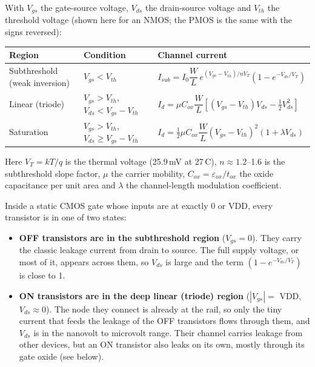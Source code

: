 \documentclass[10pt]{article}
\begin{document}
With $V_{gs}$ the gate-source voltage, $V_{ds}$ the drain-source voltage and $V_{th}$ the
threshold voltage (shown here for an NMOS; the PMOS is the same with the signs reversed):

\begin{table}[H]
\centering
\small
\begin{tabularx}{\textwidth}{@{}p{3.2cm}p{3.6cm}L@{}}
\toprule
Region & Condition & Channel current \\
\midrule
Subthreshold (weak inversion) & $V_{gs} < V_{th}$ & $I_{sub} = I_0 \dfrac{W}{L}\, e^{(V_{gs}-V_{th})/nV_T}\left(1 - e^{-V_{ds}/V_T}\right)$ \\[8pt]
Linear (triode) & $V_{gs} > V_{th}$, $V_{ds} < V_{gs} - V_{th}$ & $I_{d} = \mu C_{ox} \dfrac{W}{L}\left[(V_{gs}-V_{th})V_{ds} - \tfrac{1}{2}V_{ds}^2\right]$ \\[8pt]
Saturation & $V_{gs} > V_{th}$, $V_{ds} \ge V_{gs} - V_{th}$ & $I_{d} = \tfrac{1}{2}\mu C_{ox} \dfrac{W}{L}(V_{gs}-V_{th})^2(1+\lambda V_{ds})$ \\
\bottomrule
\end{tabularx}
\end{table}

Here $V_T = kT/q$ is the thermal voltage (25.9\,mV at 27\,\textdegree C), $n \approx 1.2$--1.6 is
the subthreshold slope factor, $\mu$ the carrier mobility, $C_{ox} = \varepsilon_{ox}/t_{ox}$ the
oxide capacitance per unit area and $\lambda$ the channel-length modulation coefficient.

Inside a static CMOS gate whose inputs are at exactly 0 or VDD, every transistor is in one of two
states:
\begin{itemize}
\item \textbf{OFF transistors are in the subthreshold region} ($V_{gs} = 0$). They carry the
classic leakage current from drain to source. The full supply voltage, or most of it, appears
across them, so $V_{ds}$ is large and the term $(1 - e^{-V_{ds}/V_T})$ is close to 1.
\item \textbf{ON transistors are in the deep linear (triode) region} ($|V_{gs}| = $ VDD,
$V_{ds} \approx 0$). The node they connect is already at the rail, so only the tiny current that
feeds the leakage of the OFF transistors flows through them, and $V_{ds}$ is in the nanovolt to
microvolt range. Their channel carries leakage from other devices, but an ON transistor also leaks
on its own, mostly through its gate oxide (see below).
\end{itemize}
\end{document}
